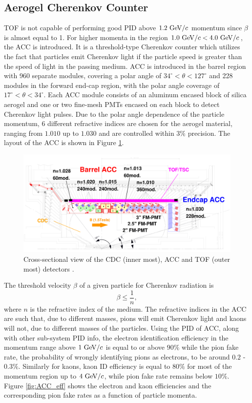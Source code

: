 \subsection{Aerogel Cherenkov Counter}
TOF is not capable of performing good PID above $1.2\mathrm{~GeV}/c$ momentum since $\beta$ is almost equal to 1. For higher momenta in the region $1.0\mathrm{~GeV}/c < 4.0\mathrm{~GeV}/c$, the ACC is introduced. It is a threshold-type Cherenkov counter which utilizes the fact that particles emit Cherenkov light if the particle speed is greater than the speed of light in the passing medium. ACC is introduced in the barrel region with 960 separate modules, covering a polar angle of $34^\circ < \theta < 127^\circ$ and 228 modules in the forward end-cap region, with the polar angle coverage of $17^\circ < \theta < 34^\circ$. Each ACC module consists of an aluminum encased block of silica aerogel and one or two fine-mesh PMTs encased on each block to detect Cherenkov light pulses. Due to the polar angle dependence of the particle momentum, 6 different refractive indices are chosen for the aerogel material, ranging from $1.010$ up to $1.030$ and are controlled within $3\%$ precision. The layout of the ACC is shown in Figure \ref{fig:ACC_layout}.
\begin{figure}[!htb]
	\centering
	\captionsetup{width=0.8\linewidth}
	\includegraphics[width=\linewidth]{fig/setup/ACC_layout}
	\caption{Cross-sectional view of the CDC (inner most), ACC and TOF (outer most) detectors \cite{ABASHIAN2002117}.}
	\label{fig:ACC_layout}
\end{figure}
The threshold velocity $\beta$ of a given particle for Cherenkov radiation is
\begin{equation}
\beta \leq \frac{1}{n},
\end{equation}
where $n$ is the refractive index of the medium. The refractive indices in the ACC are such that, due to different masses, pions will emit Cherenkov light and kaons will not, due to different masses of the particles. Using the PID of ACC, along with other sub-system PID info, the electron identification efficiency in the momentum range above $1\mathrm{~GeV}/c$ is equal to or above $90\%$ while the pion fake rate, the probability of wrongly identifying pions as electrons, to be around $0.2$ - $0.3\%$. Similarly for kaons, kaon ID efficiency is equal to $80\%$ for most of the momentum region up to $4\mathrm{~GeV}/c$, while pion fake rate remains below $10\%$. Figure \ref{fig:ACC_eff} shows the electron and kaon efficiencies and the corresponding pion fake rates as a function of particle momenta.


